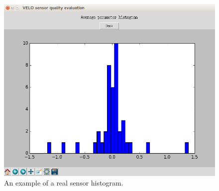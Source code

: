 \documentclass[a4paper,10pt]{article}
\begin{document}
\begin{figure}[H] \centering
    \includegraphics[width=.8\textwidth]{../fig/app_shots/hist}
    \caption{An example of a real sensor histogram.}
\end{figure}

\end{document}
